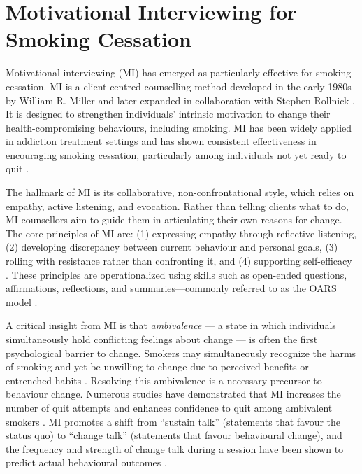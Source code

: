 \section{Motivational Interviewing for Smoking Cessation}

Motivational interviewing (MI) has emerged as particularly effective for smoking
cessation. MI is a client-centred counselling method developed in the early 1980s by
William R. Miller and later expanded in collaboration with Stephen Rollnick
\cite{miller1991motivational,MillerRollnick2023}. It is designed to strengthen
individuals' intrinsic motivation to change their health-compromising behaviours,
including smoking. MI has been widely applied in addiction treatment settings and has
shown consistent effectiveness in encouraging smoking cessation, particularly among
individuals not yet ready to quit \cite{bischof2021evidence,hettema2005meta}.

The hallmark of MI is its collaborative, non-confrontational style, which relies on
empathy, active listening, and evocation. Rather than telling clients what to do, MI
counsellors aim to guide them in articulating their own reasons for change. The core
principles of MI are: (1) expressing empathy through reflective listening, (2)
developing discrepancy between current behaviour and personal goals, (3) rolling with
resistance rather than confronting it, and (4) supporting self-efficacy
\cite{rollnick2008motivational}. These principles are operationalized using skills such
as open-ended questions, affirmations, reflections, and summaries---commonly referred
to as the OARS model \cite{Miller_2023}.

A critical insight from MI is that \emph{ambivalence} --- a state in which individuals
simultaneously hold conflicting feelings about change --- is often the first
psychological barrier to change. Smokers may simultaneously recognize the harms of
smoking and yet be unwilling to change due to perceived benefits or entrenched habits
\cite{brown2023mi}. Resolving this ambivalence is a necessary precursor to behaviour
change. Numerous studies have demonstrated that MI increases the number of quit
attempts and enhances confidence to quit among ambivalent smokers \cite{Abar2013,
	Gwaltney2009-wj}. MI promotes a shift from ``sustain talk'' (statements that favour the
status quo) to ``change talk'' (statements that favour behavioural change), and the
frequency and strength of change talk during a session have been shown to predict
actual behavioural outcomes \cite{Apodaca2009}.

